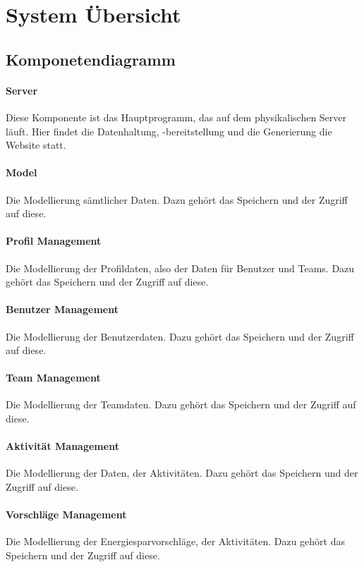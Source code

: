 \section{System \"Ubersicht}

\subsection{Komponetendiagramm}

\paragraph{Server} Diese Komponente ist das Hauptprogramm, das auf dem physikalischen Server läuft. Hier findet die Datenhaltung, -bereitstellung und die Generierung die Website statt.

\paragraph{Model} Die Modellierung sämtlicher Daten. Dazu gehört das Speichern und der Zugriff auf diese.

\paragraph{Profil Management} Die Modellierung der Profildaten, also der Daten für Benutzer und Teams. Dazu gehört das Speichern und der Zugriff auf diese.

\paragraph{Benutzer Management} Die Modellierung der Benutzerdaten. Dazu gehört das Speichern und der Zugriff auf diese.

\paragraph{Team Management} Die Modellierung der Teamdaten. Dazu gehört das Speichern und der Zugriff auf diese.

\paragraph{Aktivität Management} Die Modellierung der Daten, der Aktivitäten. Dazu gehört das Speichern und der Zugriff auf diese.

\paragraph{Vorschläge Management}  Die Modellierung der Energiesparvorschläge, der Aktivitäten. Dazu gehört das Speichern und der Zugriff auf diese.

